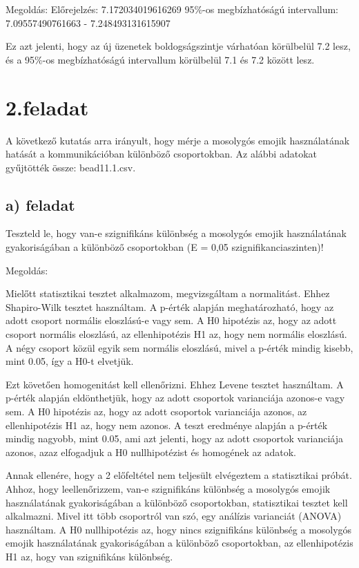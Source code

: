 \documentclass[11pt,a4paper,oneside]{report}
\begin{document}
Megoldás:
Előrejelzés: 7.172034019616269
95\%-os megbízhatóságú intervallum: 7.09557490761663 - 7.248493131615907

Ez azt jelenti, hogy az új üzenetek boldogságszintje várhatóan körülbelül 7.2 lesz,
és a 95\%-os megbízhatóságú intervallum körülbelül 7.1 és 7.2 között lesz.



\chapter{2.feladat}
A következő kutatás arra irányult, hogy mérje a mosolygós emojik használatának hatását a kommunikációban különböző csoportokban. Az alábbi adatokat gyűjtötték  össze: bead11.1.csv.

\section{a) feladat}
Teszteld le, hogy van-e szignifikáns különbség a mosolygós emojik használatának gyakoriságában a különböző csoportokban (E = 0,05 szignifikanciaszinten)!

Megoldás:

Mielőtt statisztikai tesztet alkalmazom, megvizsgáltam a normalitást.
Ehhez Shapiro-Wilk tesztet használtam. A p-érték alapján meghatározható, hogy az adott csoport normális eloszlású-e vagy sem.
A H0 hipotézis az, hogy az adott csoport normális eloszlású, az ellenhipotézis H1 az, hogy nem normális eloszlású.
A négy csoport közül egyik sem normális eloszlású, mivel a p-érték mindig kisebb, mint 0.05, így a H0-t elvetjük.

Ezt követően homogenitást kell ellenőrizni.
Ehhez Levene tesztet használtam.
A p-érték alapján eldönthetjük, hogy az adott csoportok varianciája azonos-e vagy sem.
A H0 hipotézis az, hogy az adott csoportok varianciája azonos, az ellenhipotézis H1 az, hogy nem azonos.
A teszt eredménye alapján a p-érték mindig nagyobb, mint 0.05, ami azt jelenti, hogy az adott csoportok varianciája azonos, azaz elfogadjuk a H0 nullhipotézist és homogének az adatok.

Annak ellenére, hogy a 2 előfeltétel nem teljesült elvégeztem a statisztikai próbát.
Ahhoz, hogy leellenőrizzem, van-e szignifikáns különbség a mosolygós emojik használatának gyakoriságában a különböző csoportokban, statisztikai tesztet kell alkalmazni.
Mivel itt több csoportról van szó, egy análízis varianciát (ANOVA) használtam.
A H0 nullhipotézis az, hogy nincs szignifikáns különbség a mosolygós emojik használatának gyakoriságában a különböző csoportokban, az ellenhipotézis H1 az, hogy van szignifikáns különbség.
\end{document}
